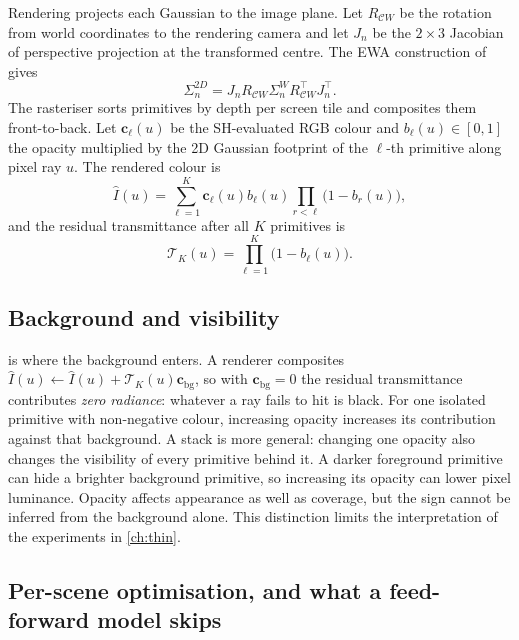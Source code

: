 Rendering projects each Gaussian to the image plane. Let $R_{\mathcal CW}$ be
the rotation from world coordinates to the rendering camera and let $J_n$ be
the $2\times3$ Jacobian of perspective projection at the transformed centre.
The EWA construction of \citet{zwicker2001ewa} gives
\begin{equation}
\Sigma_n^{2D}
  =J_n R_{\mathcal CW}\Sigma_n^W R_{\mathcal CW}^{\top}J_n^{\top}.
\label{eq:proj}
\end{equation}
The rasteriser sorts primitives by depth per screen tile and composites them
front-to-back. Let $\mathbf c_\ell(u)$ be the SH-evaluated RGB colour and
$b_\ell(u)\in[0,1]$ the opacity multiplied by the 2D Gaussian footprint of the
$\ell$-th primitive along pixel ray $u$. The rendered colour is
\begin{equation}
\hat I(u)=\sum_{\ell=1}^{K}\mathbf c_\ell(u)b_\ell(u)
          \prod_{r<\ell}\bigl(1-b_r(u)\bigr),
\label{eq:alphacomp}
\end{equation}
and the residual transmittance after all $K$ primitives is
\begin{equation}
\mathcal T_{K}(u)=\prod_{\ell=1}^{K}\bigl(1-b_\ell(u)\bigr).
\label{eq:transmittance}
\end{equation}

\subsection{Background and visibility}
\label{sec:bg:black}

 is where the background enters. A renderer composites
$\hat I(u)\leftarrow\hat I(u)+\mathcal T_K(u)\mathbf c_{\mathrm{bg}}$, so with
$\mathbf c_{\mathrm{bg}}=0$ the residual
transmittance contributes \emph{zero radiance}: whatever a ray fails to hit is
black. For one isolated primitive with non-negative colour, increasing
opacity increases its contribution against that background. A stack is more
general: changing one opacity also changes the visibility of every primitive
behind it. A darker foreground primitive can hide a brighter background
primitive, so increasing its opacity can lower pixel luminance.
Opacity affects appearance as well as coverage, but the sign cannot be
inferred from the background alone. This distinction limits the
interpretation of the experiments in \cref{ch:thin}.

\subsection{Per-scene optimisation, and what a feed-forward model skips}


